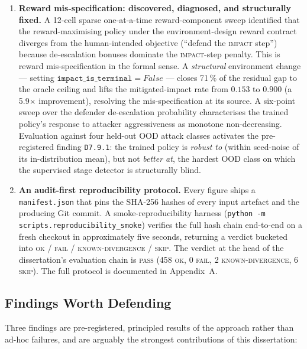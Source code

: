 \begin{enumerate}
    \item \textbf{Reward mis-specification: discovered, diagnosed, and structurally fixed.} A 12-cell sparse one-at-a-time reward-component sweep identified that the reward-maximising policy under the environment-design reward contract diverges from the human-intended objective (``defend the \textsc{impact} step'') because de-escalation bonuses dominate the \textsc{impact}-step penalty. This is reward mis-specification in the formal sense. A \emph{structural} environment change --- setting $\texttt{impact\_is\_terminal}=\mathit{False}$ --- closes 71\,\% of the residual gap to the oracle ceiling and lifts the mitigated-impact rate from $0.153$ to $0.900$ (a 5.9$\times$ improvement), resolving the mis-specification at its source. A six-point sweep over the defender de-escalation probability characterises the trained policy's response to attacker aggressiveness as monotone non-decreasing. Evaluation against four held-out OOD attack classes activates the pre-registered finding \texttt{D7.9.1}: the trained policy is \emph{robust to} (within seed-noise of its in-distribution mean), but not \emph{better at}, the hardest OOD class on which the supervised stage detector is structurally blind.

    \item \textbf{An audit-first reproducibility protocol.} Every figure ships a \texttt{manifest.json} that pins the SHA-256 hashes of every input artefact and the producing Git commit. A smoke-reproducibility harness (\texttt{python -m scripts.reproducibility\_smoke}) verifies the full hash chain end-to-end on a fresh checkout in approximately five seconds, returning a verdict bucketed into \textsc{ok} / \textsc{fail} / \textsc{known-divergence} / \textsc{skip}. The verdict at the head of the dissertation's evaluation chain is \textsc{pass} (458 \textsc{ok}, 0 \textsc{fail}, 2 \textsc{known-divergence}, 6 \textsc{skip}). The full protocol is documented in Appendix~A.
\end{enumerate}

\subsection{Findings Worth Defending}\label{subsec:findings}
Three findings are pre-registered, principled results of the approach rather than ad-hoc failures, and are arguably the strongest contributions of this dissertation:


